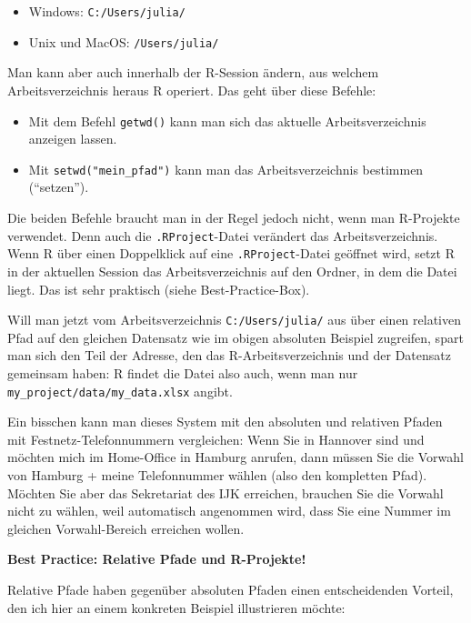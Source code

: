 \documentclass[
]{book}
\begin{document}
\begin{itemize}
\item
  Windows: \texttt{C:/Users/julia/}
\item
  Unix und MacOS: \texttt{/Users/julia/}
\end{itemize}

Man kann aber auch innerhalb der R-Session ändern, aus welchem Arbeitsverzeichnis heraus R operiert. Das geht über diese Befehle:

\begin{itemize}
\item
  Mit dem Befehl \texttt{getwd()} kann man sich das aktuelle Arbeitsverzeichnis anzeigen lassen.
\item
  Mit \texttt{setwd("mein\_pfad")} kann man das Arbeitsverzeichnis bestimmen (``setzen'').
\end{itemize}

Die beiden Befehle braucht man in der Regel jedoch nicht, wenn man R-Projekte verwendet. Denn auch die \texttt{.RProject}-Datei verändert das Arbeitsverzeichnis. Wenn R über einen Doppelklick auf eine \texttt{.RProject}-Datei geöffnet wird, setzt R in der aktuellen Session das Arbeitsverzeichnis auf den Ordner, in dem die Datei liegt. Das ist sehr praktisch (siehe Best-Practice-Box).

Will man jetzt vom Arbeitsverzeichnis \texttt{C:/Users/julia/} aus über einen relativen Pfad auf den gleichen Datensatz wie im obigen absoluten Beispiel zugreifen, spart man sich den Teil der Adresse, den das R-Arbeitsverzeichnis und der Datensatz gemeinsam haben: R findet die Datei also auch, wenn man nur \texttt{my\_project/data/my\_data.xlsx} angibt.

Ein bisschen kann man dieses System mit den absoluten und relativen Pfaden mit Festnetz-Telefonnummern vergleichen: Wenn Sie in Hannover sind und möchten mich im Home-Office in Hamburg anrufen, dann müssen Sie die Vorwahl von Hamburg + meine Telefonnummer wählen (also den kompletten Pfad). Möchten Sie aber das Sekretariat des IJK erreichen, brauchen Sie die Vorwahl nicht zu wählen, weil automatisch angenommen wird, dass Sie eine Nummer im gleichen Vorwahl-Bereich erreichen wollen.

\leavevmode\hypertarget{info_best_practice_rproj}{}%
\textbf{Best Practice: Relative Pfade und R-Projekte!}

Relative Pfade haben gegenüber absoluten Pfaden einen entscheidenden Vorteil, den ich hier an einem konkreten Beispiel illustrieren möchte:
\end{document}
